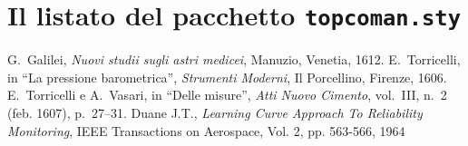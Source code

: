 \documentclass[%
    corpo=11.5pt,
    twoside,
    evenboxes,
    tipotesi=triennale,%
    stile=classica,
    oldstyle,
    autoretitolo,
    greek,
]{toptesi}
\begin{document}
\appendix

\chapter{Il listato del pacchetto \texttt{topcoman.sty}}


\begin{thebibliography}{9}
 G.~Galilei, {\em Nuovi studii sugli astri medicei}, Manuzio,
        Venetia, 1612.
 E.~Torricelli, in ``La pressione barometrica'', {\em Strumenti
        Moderni}, Il Porcellino, Firenze, 1606.
 E.~Torricelli e A.~Vasari, in ``Delle misure'', {\em Atti Nuovo
        Cimento}, vol.~III, n.~2 (feb. 1607), p.~27--31.
 Duane J.T., \emph{Learning Curve Approach To Reliability 
		Monitoring}, IEEE Transactions on Aerospace, Vol. 2, pp. 563-566, 1964
\end{thebibliography}
\end{document}
